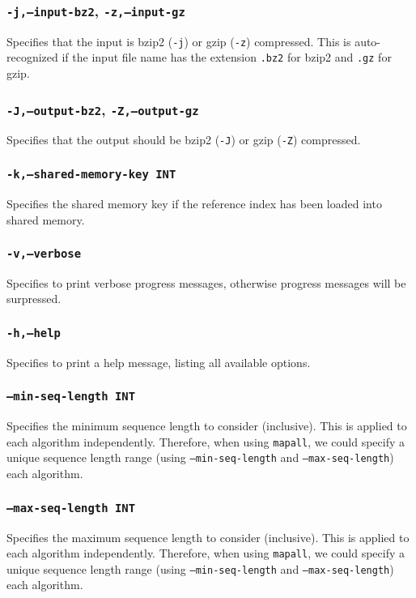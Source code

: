 \documentclass[a4paper,12pt]{book}
\newcommand{\TT}[1]{{\tt #1}} %
\begin{document}
\subsubsection{\TT{-j,--input-bz2}, \TT{-z,--input-gz}}
Specifies that the input is bzip2 (\TT{-j}) or gzip (\TT{-z}) compressed.
This is auto-recognized if the input file name has the extension \TT{.bz2} for bzip2 and \TT{.gz} for gzip.

\subsubsection{\TT{-J,--output-bz2}, \TT{-Z,--output-gz}}
Specifies that the output should be bzip2 (\TT{-J}) or gzip (\TT{-Z}) compressed.

\subsubsection{\TT{-k,--shared-memory-key INT}}
Specifies the shared memory key if the reference index has been loaded into shared memory.

\subsubsection{\TT{-v,--verbose}}
Specifies to print verbose progress messages, otherwise progress messages will be surpressed.

\subsubsection{\TT{-h,--help}}
Specifies to print a help message, listing all available options.

\subsubsection{\TT{--min-seq-length INT}}
Specifies the minimum sequence length to consider (inclusive).
This is applied to each algorithm independently.
Therefore, when using \TT{mapall}, we could specify a unique sequence length range (using \TT{---min-seq-length} and \TT{---max-seq-length}) each algorithm.

\subsubsection{\TT{--max-seq-length INT}}
Specifies the maximum sequence length to consider (inclusive).
This is applied to each algorithm independently.
Therefore, when using \TT{mapall}, we could specify a unique sequence length range (using \TT{---min-seq-length} and \TT{---max-seq-length}) each algorithm.
\end{document}
